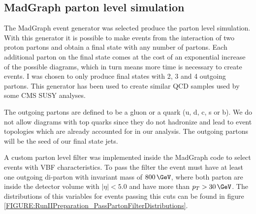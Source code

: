 \subsection{MadGraph parton level simulation}
\label{SUBSECTION:RunIIPreparation_MadGraphPartonLevelSimulation}


The MadGraph event generator was selected produce the parton level simulation. With this generator it is possible to make events from the interaction of two proton partons and obtain a final state with any number of partons. Each additional parton on the final state comes at the cost of an exponential increase of the possible diagrams, which in turn means more time is necessary to create events. I was chosen to only produce final states with 2, 3 and 4 outgoing partons. This generator has been used to create similar \gls{QCD} samples used by some \gls{CMS} \gls{SUSY} analyses. 

The outgoing partons are defined to be a gluon or a quark (u, d, c, s or b). We do not allow diagrams with top quarks since they do not hadronize and lead to event topologies which are already accounted for in our analysis. The outgoing partons will be the seed of our final state jets. 

A custom parton level filter was implemented inside the MadGraph code to select events with \gls{VBF} characteristics. To pass the filter the event must have at least one outgoing di-parton with invariant mass of $800\,\GeV$, where both parton are inside the detector volume with $|\eta|<5.0$ and have more than $p_{T}>30\,\GeV$. The distributions of this variables for events passing this cuts can be found in figure \ref{FIGURE:RunIIPreparation_PassPartonFilterDistributions}.

